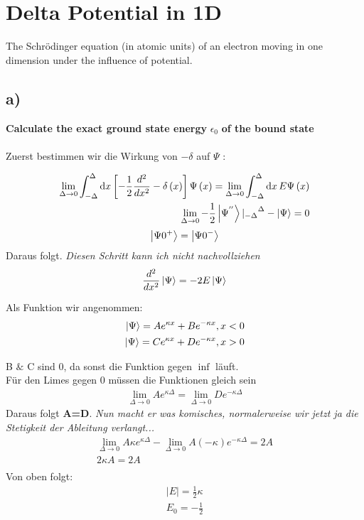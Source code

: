 \section{Delta Potential in 1D}

The Schr\"odinger equation (in atomic units) of an electron moving in one dimension under
the influence of potential.



\subsection{a)}

\textbf{Calculate the exact ground state energy} $\epsilon_{0}$  \textbf{of the bound state} \\
\\


Zuerst bestimmen wir die Wirkung von $-\delta$ auf $\Psi$ :

\begin{align}
\lim\limits_{\Delta\to0} \int_{-\Delta}^{\Delta}  \mathrm{d}x
\left[ - \frac{1}{2} \frac{d^{2}}{dx^{2}} - \delta \left( x \right) \right] \Psi \left( x \right) =
\lim\limits_{\Delta\to0} \int_{-\Delta}^{\Delta}  \mathrm{d}x \, E \Psi \left( x \right) \\
\lim\limits_{\Delta\to0}  - \frac{1}{2} \Ket{\Psi^{''}} {|_{-\Delta}}^{\Delta} - \Ket{\Psi} = 0
\end{align}
\begin{equation}
\Ket{\Psi  0^{+} } = \Ket{\Psi  0^{-} }
\end{equation}
Daraus folgt. \textit{Diesen Schritt kann ich nicht nachvollziehen}
\begin{align}
\frac{d^{2}}{dx^{2}} \Ket{\Psi} = -2E \Ket{\Psi}
\end{align}

Als Funktion wir angenommen:
\begin{align}
\Ket{\Psi} = A e^{\kappa x} + B e^{-\kappa x} , x < 0 \\
\Ket{\Psi} = C e^{\kappa x} + D e^{-\kappa x} , x > 0
\end{align}

B $\&$ C sind 0, da sonst die Funktion gegen $\inf$ l\"auft.\\

F\"ur den Limes gegen 0 m\"ussen die Funktionen gleich sein
\begin{align}
\lim\limits_{\Delta\to0} A e^{\kappa \Delta} = \lim\limits_{\Delta\to0} D e^{- \kappa \Delta}
\end{align}
Daraus folgt \textbf{A=D}. \textit{Nun macht er was komisches, normalerweise wir jetzt ja die Stetigkeit der Ableitung verlangt...}
\begin{align}
\lim\limits_{\Delta\to0} A \kappa e^{\kappa \Delta} - \lim\limits_{\Delta\to0} A \left(-\kappa\right) e^{-\kappa \Delta} = 2A \\
2 \kappa A = 2 A \\
\end{align}
Von oben folgt:
\begin{align}
|E| = \frac{1}{2} \kappa \\
E_{0} = - \frac{1}{2}
\end{align}


